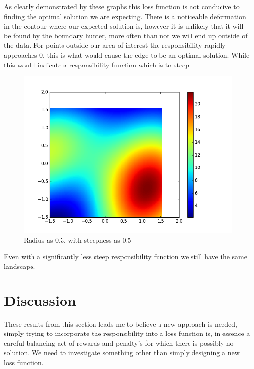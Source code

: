 \documentclass[notitlepage]{report}
\theoremstyle{definition}
\begin{document}
As clearly demonstrated by these graphs this loss function is not conducive to finding the optimal solution we are expecting.  There is a noticeable deformation in the contour where our expected solution is, however it is unlikely that it will be found by the boundary hunter, more often than not we will end up outside of the data. For points outside our area of interest the responsibility rapidly approaches 0, this is what would cause the edge to be an optimal solution. While this would indicate a responsibility function which is to steep.

\begin{figure}[H]
  \centering
  \begin{minipage}[b]{0.8\textwidth}
    \includegraphics[width=\textwidth]{LossPlot-4.png}
    \caption{Radius as 0.3, with steepness as 0.5}
  \end{minipage}
  \hfill
\end{figure}

Even with a significantly less steep responsibility function we still have the same landscape. 

\section{Discussion}
These results from this section leads me to believe a new approach is needed, simply trying to incorporate the responsibility into a loss function is, in essence a careful balancing act of rewards and penalty's for which there is possibly no solution. We need to investigate something other than simply designing a new loss function.
\end{document}
